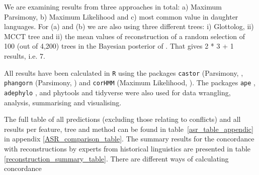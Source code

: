 \documentclass[a4paper,10pt]{article} %
\begin{document}
We are examining results from three approaches in total: a) Maximum Parsimony, b) Maximum Likelihood and c) most common value in daughter languages. For (a) and (b) we are also using three different trees: i) Glottolog, ii) \citet{grayetal_2009} MCCT tree and ii) the mean values of reconstruction of a random selection of 100 (out of 4,200) trees in the Bayesian posterior of \citet{grayetal_2009}. That gives 2 * 3 + 1 results, i.e. 7.


All results have been calculated in \texttt{R} \citep{R} using the packages \texttt{castor} (Parsimony, \citet{louca2017efficient}, \texttt{phangorn} (Parsimony, \citet{phangorn}) and \texttt{corHMM} (Maximum Likelihood, \citet{corHMM}). The packages \texttt{ape} \citep{paradis2004ape}, \texttt{adephylo} \citep{jombart2017package}, and phytools \citep{revell2012phytools} and tidyverse \citep{tidyverse13} were also used for data wrangling, analysis, summarising and visualising.

The full table of all predictions (excluding those relating to conflicts) and all results per feature, tree and method can be found in table~\ref{asr_table_appendic} in appendix \ref{ASR_comparison_table}. The summary results for the concordance with reconstructions by experts from historical linguistics are presented in table \ref{reconstruction_summary_table}. There are different ways of calculating concordance
 
%
%
%
%
\end{document}
